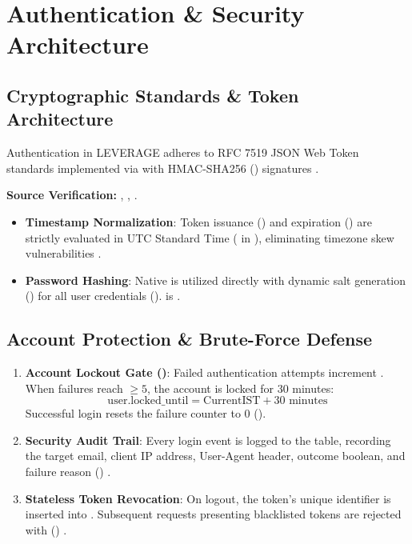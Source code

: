 \chapter{Authentication \& Security Architecture}
\label{ch:auth_security}

\section{Cryptographic Standards \& Token Architecture}
Authentication in LEVERAGE adheres to RFC 7519 JSON Web Token standards implemented via  with HMAC-SHA256 () signatures \cite{ref:auth_py}.

\begin{citationbox}
\textbf{Source Verification:} , , .
\end{citationbox}

\begin{itemize}[leftmargin=6mm,itemsep=1.5mm]
    \item \textbf{Timestamp Normalization}: Token issuance () and expiration () are strictly evaluated in UTC Standard Time ( in ), eliminating timezone skew vulnerabilities .
    \item \textbf{Password Hashing}: Native  is utilized directly with dynamic salt generation () for all user credentials ().  is .
\end{itemize}

\section{Account Protection \& Brute-Force Defense}
\begin{enumerate}[leftmargin=6mm,itemsep=2mm]
    \item \textbf{Account Lockout Gate ()}:
    Failed authentication attempts increment . When failures reach $\ge 5$, the account is locked for 30 minutes:
    \begin{equation}
        \mathrm{user.locked\_until} = \mathrm{CurrentIST} + 30\text{ minutes}
    \end{equation}
    Successful login resets the failure counter to 0 ().
    \item \textbf{Security Audit Trail}:
    Every login event is logged to the  table, recording the target email, client IP address, User-Agent header, outcome boolean, and failure reason () .
    \item \textbf{Stateless Token Revocation}:
    On logout, the token's unique  identifier is inserted into . Subsequent requests presenting blacklisted  tokens are rejected with  () .
\end{enumerate}
